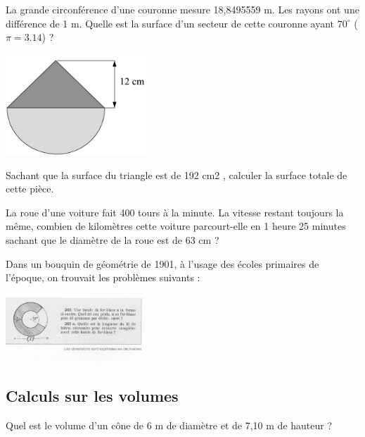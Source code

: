 \begin{exercice}
La grande circonférence d'une couronne mesure 18,8495559 m. Les rayons ont une différence de 1 m. 
Quelle est la surface d'un secteur de cette couronne ayant $70^\circ$ ($\pi =3.14$) ?
\begin{center}
\includegraphics[width= 0.4\textwidth]{volume/image/ex13.png}
\end{center}
\end{exercice}

\begin{exercice}
Sachant que la surface du triangle est de 192 cm2 , calculer la surface totale de cette pièce. 
\end{exercice}

\begin{exercice}
La roue d’une voiture fait 400 tours à la minute. La vitesse restant toujours la même, combien de kilomètres cette voiture parcourt-elle en 1 heure 25 minutes sachant que le diamètre de la roue est de 63 cm ? 
\end{exercice}

\begin{exercice}
Dans un bouquin de géométrie de 1901, à l’usage des écoles primaires de l’époque, on trouvait les problèmes suivants :
\begin{center}
\includegraphics[width= 0.4\textwidth]{volume/image/ex17.png}
\end{center}
\end{exercice}

\subsection{Calculs sur les volumes}

\begin{exercice}
Quel est le volume d’un cône de 6 m de diamètre et de 7,10 m de hauteur ?
\end{exercice}

